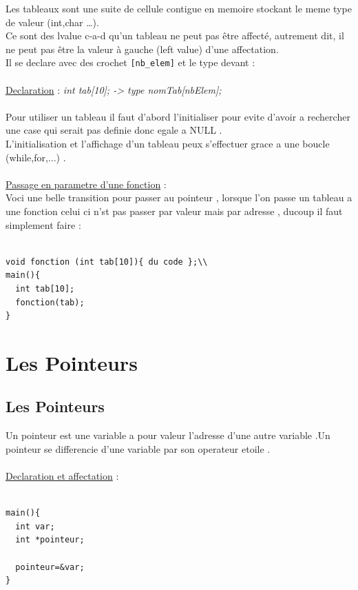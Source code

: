 \documentclass[a4paper,12pt,openany]{book}
\begin{document}
Les tableaux sont une suite de cellule contigue en memoire stockant le meme type de valeur (int,char \ldots).\\
Ce sont des lvalue c-a-d qu'un tableau ne peut pas \^etre affect\'e, autrement dit, il ne peut pas \^etre la valeur à gauche (left value) d’une affectation.\\
Il se declare avec des crochet \verb+[nb_elem]+ et le type devant :\\
\\
\underline{Declaration} : \emph{int tab[10]; -> type nomTab[nbElem];}\\
\\
Pour utiliser un tableau il faut d'abord l'initialiser pour evite d'avoir a rechercher une case qui serait pas definie donc egale a NULL .\\
L'initialisation et l'affichage d'un tableau peux s'effectuer grace a une boucle (while,for,...) .\\
\\
\underline{Passage en parametre d'une fonction} :\\

Voci une belle transition pour passer au pointeur , lorsque l'on passe un tableau a une fonction celui ci n'st pas passer par valeur mais par adresse , ducoup il faut simplement faire :\\
\\
\begin{verbatim}
void fonction (int tab[10]){ du code };\\
main(){ 
  int tab[10];
  fonction(tab);
}
\end{verbatim}




\chapter{Les Pointeurs}

\section{Les Pointeurs}
Un pointeur est une variable a pour valeur  l'adresse d'une autre variable .Un pointeur se differencie d'une variable par son operateur etoile \* .\\
\\
\underline{Declaration et affectation} : \\
\\
\begin{verbatim}
main(){
  int var;
  int *pointeur;  

  pointeur=&var;
}
\end{verbatim}
\end{document}
